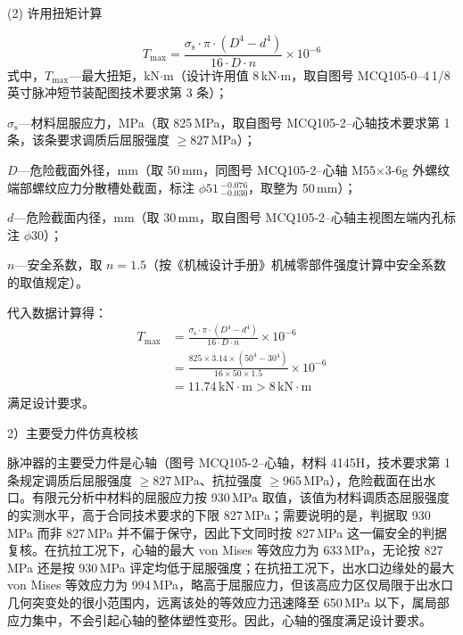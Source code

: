(2) 许用扭矩计算

\begin{equation}
    T_{\max} = \frac{\sigma_{\mathrm{s}} \cdot \pi \cdot (D^4 - d^4)}{16 \cdot D \cdot n} \times 10^{-6}
\end{equation}
式中，$T_{\max}$---最大扭矩，kN$\cdot$m（设计许用值 8\,kN$\cdot$m，取自图号 MCQ105-0--4\,1/8 英寸脉冲短节装配图技术要求第 3 条）；

$\sigma_{\mathrm{s}}$---材料屈服应力，MPa（取 825\,MPa，取自图号 MCQ105-2--心轴技术要求第 1 条，该条要求调质后屈服强度 $\ge 827$\,MPa）；

$D$---危险截面外径，mm（取 50\,mm，同图号 MCQ105-2--心轴 M55$\times$3-6g 外螺纹端部螺纹应力分散槽处截面，标注 $\phi 51\,_{-0.030}^{-0.076}$，取整为 50\,mm）；

$d$---危险截面内径，mm（取 30\,mm，取自图号 MCQ105-2--心轴主视图左端内孔标注 $\phi 30$）；

$n$---安全系数，取 $n = 1.5$（按《机械设计手册》机械零部件强度计算中安全系数的取值规定\cite{ref26}）。

代入数据计算得：
\begin{equation}
\begin{aligned}
    T_{\max} &= \frac{\sigma_{\mathrm{s}} \cdot \pi \cdot (D^4 - d^4)}{16 \cdot D \cdot n} \times 10^{-6} \\
             &= \frac{825 \times 3.14 \times (50^4 - 30^4)}{16 \times 50 \times 1.5} \times 10^{-6} \\
             &= 11.74 \, \text{kN} \cdot \text{m} > 8 \, \text{kN} \cdot \text{m} 
\end{aligned}
\end{equation}
满足设计要求。

2）主要受力件仿真校核

脉冲器的主要受力件是心轴（图号 MCQ105-2--心轴，材料 4145H，技术要求第 1 条规定调质后屈服强度 $\ge 827$\,MPa、抗拉强度 $\ge 965$\,MPa），危险截面在出水口。有限元分析中材料的屈服应力按 930\,MPa 取值，该值为材料调质态屈服强度的实测水平，高于合同技术要求的下限 827\,MPa；需要说明的是，判据取 930\,MPa 而非 827\,MPa 并不偏于保守，因此下文同时按 827\,MPa 这一偏安全的判据复核。在抗拉工况下，心轴的最大 von Mises 等效应力为 633\,MPa，无论按 827\,MPa 还是按 930\,MPa 评定均低于屈服强度；在抗扭工况下，出水口边缘处的最大 von Mises 等效应力为 994\,MPa，略高于屈服应力，但该高应力区仅局限于出水口几何突变处的很小范围内，远离该处的等效应力迅速降至 650\,MPa 以下，属局部应力集中，不会引起心轴的整体塑性变形。因此，心轴的强度满足设计要求。


